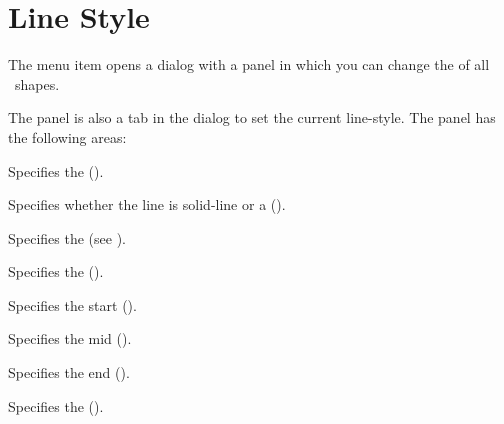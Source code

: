 
\section{Line Style}\label{sec:pathstyle}


The  menu item opens a dialog
with a  panel in which
you can change the  
of all \selected\ \glspl{shape}.


The  panel is also a tab
in the  dialog to set the current
\gls{line-style}. The panel has the following areas:
\begin{deflist}
\begin{itemdesc}
Specifies the  ().
\end{itemdesc}

\begin{itemdesc}
Specifies whether the line is \gls{solid-line} or a 
().
\end{itemdesc}

\begin{itemdesc}
Specifies the  (see ).
\end{itemdesc}

\begin{itemdesc}
Specifies the  ().
\end{itemdesc}

\begin{itemdesc}
Specifies the start  ().
\end{itemdesc}

\begin{itemdesc}
Specifies the mid  ().
\end{itemdesc}

\begin{itemdesc}
Specifies the end  ().
\end{itemdesc}

\begin{itemdesc}
Specifies the  ().
\end{itemdesc}

\end{deflist}


